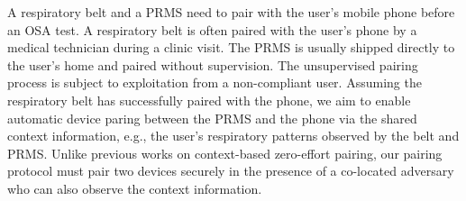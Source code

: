 
A respiratory belt and a PRMS need to pair with the user's mobile phone before an OSA test.  A respiratory belt is often paired with the user's phone by a medical technician during a clinic visit. The PRMS is usually shipped directly to the user's home and paired without supervision. The unsupervised pairing process is subject to exploitation from a non-compliant user. Assuming the respiratory belt has successfully paired with the phone,  we aim to enable automatic device paring between the PRMS and the phone via the shared context information, e.g., the user's respiratory patterns observed by the belt and PRMS. Unlike previous works on context-based zero-effort pairing, our pairing protocol must pair two devices securely in the presence of a co-located adversary who can also observe the context information.



